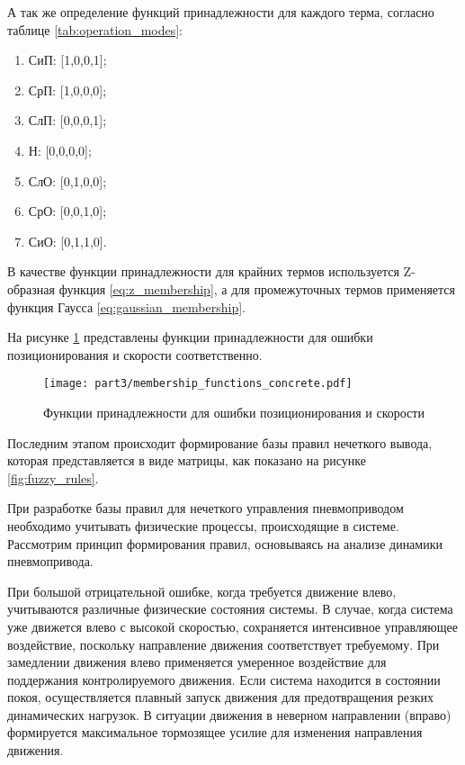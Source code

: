 А так же определение функций принадлежности для каждого терма, согласно таблице
\ref{tab:operation_modes}:
\begin{enumerate}
	\item СиП: [1,0,0,1];
	\item СрП: [1,0,0,0];
	\item СлП: [0,0,0,1]; 
	\item Н: [0,0,0,0];
	\item СлО: [0,1,0,0];
	\item СрО: [0,0,1,0];
	\item СиО: [0,1,1,0].
\end{enumerate}

В качестве функции принадлежности для крайних термов используется Z-образная функция \ref{eq:z_membership},
а для промежуточных термов применяется функция Гаусса \ref{eq:gaussian_membership}.

На рисунке \ref{fig:membership_functions_concrete} представлены функции принадлежности
для ошибки позиционирования и скорости соответственно.

\begin{figure}[ht]
	\centering
	\texttt{[image: part3/membership\_functions\_concrete.pdf]}
	\caption{Функции принадлежности для ошибки позиционирования и скорости}
	\label{fig:membership_functions_concrete}
\end{figure}

Последним этапом происходит формирование базы правил нечеткого вывода, которая представляется
в виде матрицы, как показано на рисунке \ref{fig:fuzzy_rules}.

При разработке базы правил для нечеткого управления пневмоприводом
необходимо учитывать физические процессы, происходящие в системе.
Рассмотрим принцип формирования правил, основываясь на анализе
динамики пневмопривода.

При большой отрицательной ошибке, когда требуется движение влево,
учитываются различные физические состояния системы. В случае,
когда система уже движется влево с высокой скоростью, сохраняется
интенсивное управляющее воздействие, поскольку направление движения
соответствует требуемому. При замедлении движения влево применяется
умеренное воздействие для поддержания контролируемого движения.
Если система находится в состоянии покоя, осуществляется плавный
запуск движения для предотвращения резких динамических нагрузок.
В ситуации движения в неверном направлении (вправо) формируется
максимальное тормозящее усилие для изменения направления движения.

